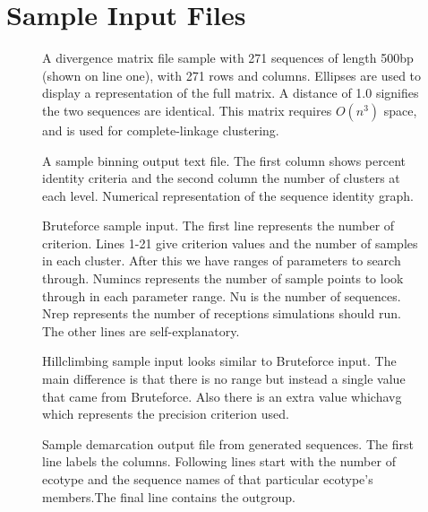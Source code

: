 \chapter{Sample Input Files}

\begin{figure}[h!]
\centering
\noindent{}
\caption[Divergence matrix sample text file.]{A divergence matrix file sample with 271 sequences of length 500bp (shown on line one), with 271 rows and columns. Ellipses are used to display a representation of the full matrix. A distance of 1.0 signifies the two sequences are identical. This matrix requires $O(n^3)$ space, and is used for complete-linkage clustering.}
\label{code:DivergenceMatrix}
\end{figure}

\begin{figure}[h!]
\centering
\noindent{}
\caption[Binning sample output.]{A sample binning output text file. The first column shows percent identity criteria and the second column the number of clusters at each level. Numerical representation of the sequence identity graph.}
\label{code:Binning}
\end{figure}

\begin{figure}[h!]
\centering
\noindent{}
\caption[Bruteforce sample input.]{Bruteforce sample input. The first line represents the number of criterion. Lines 1-21 give criterion values and the number of samples in each cluster. After this we have ranges of parameters to search through. Numincs represents the number of sample points to look through in each parameter range. Nu is the number of sequences. Nrep represents the number of receptions simulations should run. The other lines are self-explanatory.}
\label{code:Bruteforce}
\end{figure}

\begin{figure}[h!]
\centering
\noindent{}
\caption[Hillclimbing sample input.]{Hillclimbing sample input looks similar to Bruteforce input. The main difference is that there is no range but instead a single value that came from Bruteforce. Also there is an extra value whichavg which represents the precision criterion used.}
\label{code:Hillclimbing}
\end{figure}

\begin{figure}[h!]
\centering
\noindent{}
\caption[Sample demarcation output file from generated sequences.]{Sample demarcation output file from generated sequences. The first line labels the columns. Following lines start with the number of ecotype and the sequence names of that particular ecotype's members.The final line contains the outgroup.}
\label{code:DemarcationFormat}
\end{figure}
